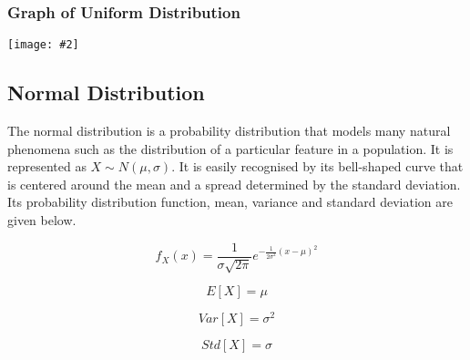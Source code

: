 \documentclass[a4paper]{article}
\newcommand*{\newincludegraphics}[2][]{
    \begin{center}
        \begin{adjustbox}{max size={\textwidth}{\textheight}}
            \texttt{[image: \#2]}
        \end{adjustbox}
    \end{center}
}
\begin{document}
    \subsubsection*{Graph of Uniform Distribution}
    \newincludegraphics[]{(C)-Uniform_distribution_visualization.png}

    \subsection{Normal Distribution}
    The normal distribution is a probability distribution that models many natural phenomena such as the distribution of a particular feature in a population. It is represented as $X \sim N(\mu, \sigma)$. It is easily recognised by its bell-shaped curve that is centered around the mean and a spread determined by the standard deviation. Its probability distribution function, mean, variance and standard deviation are given below.

    \begin{equation}
        \label{eq:normal_pdf}
        f_X(x) = \frac{1}{\sigma\sqrt{2 \pi}}e^{- \frac{1}{2\sigma^2}{(x - \mu)}^2}
    \end{equation}

    \begin{equation}
        \label{eq:normal_mean}
        E[X] = \mu
    \end{equation}

    \begin{equation}
        \label{eq:normal_variance}
        Var[X] = \sigma^2
    \end{equation}

    \begin{equation}
        \label{eq:normal_std}
        Std[X] = \sigma
    \end{equation}
\end{document}
